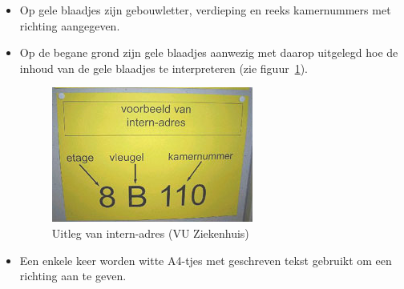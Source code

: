 \begin{itemize}
\begin{itemize}
\item Op gele blaadjes zijn gebouwletter, verdieping en reeks kamernummers met richting aangegeven.
\item Op de begane grond zijn gele blaadjes aanwezig met daarop uitgelegd hoe de inhoud van de gele blaadjes te interpreteren (zie figuur~\ref{figuur:vu_uitleg}).

\begin{figure}
\begin{center}
\includegraphics{images/vu_uitleg.jpg}
\end{center}
\caption{Uitleg van intern-adres (VU Ziekenhuis)}
\label{figuur:vu_uitleg}
\end{figure}

\item Een enkele keer worden witte A4-tjes met geschreven tekst gebruikt om een richting aan te geven.
\end{itemize}

\end{itemize}
